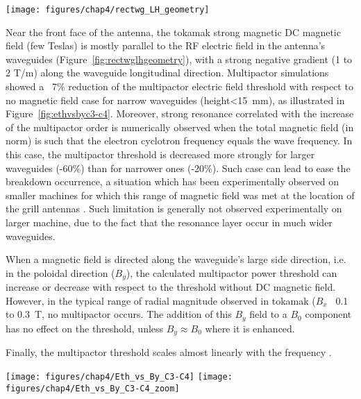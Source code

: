 \begin{marginfigure}
	\centering
	\texttt{[image: figures/chap4/rectwg\_LH\_geometry]}
	\caption{Typical geometry of a LHRF antenna thin rectangular waveguide close to the plasma.}
	\label{fig:rectwglhgeometry}
\end{marginfigure}
Near the front face of the antenna, the tokamak strong magnetic DC magnetic field (few Teslas) is mostly parallel to the RF electric field in the antenna’s waveguides (Figure~\ref{fig:rectwglhgeometry}), with a strong negative gradient (1 to 2 T/m) along the waveguide longitudinal direction. Multipactor simulations showed a ~7\% reduction of the multipactor electric field threshold with respect to no magnetic field case for narrow waveguides (height<15~mm), as illustrated in Figure~\ref{fig:ethvsbyc3-c4}. Moreover, strong resonance correlated with the increase of the multipactor order is numerically observed when the total magnetic field (in norm) is such that the electron cyclotron frequency equals the wave frequency. In this case, the multipactor threshold is decreased more strongly for larger waveguides (-60\%) than for narrower ones (-20\%). Such case can lead to ease the breakdown occurrence, a situation which has been experimentally observed on smaller machines for which this range of magnetic field was met at the location of the grill antennas . Such limitation is generally not observed experimentally on larger machine, due to the fact that the resonance layer occur in much wider waveguides. 

When a magnetic field is directed along the waveguide’s large side direction, i.e. in the poloidal direction ($B_y$), the calculated multipactor power threshold can increase or decrease with respect to the threshold without DC magnetic field. However, in the typical range of radial magnitude observed in tokamak ($B_x$ ~0.1 to 0.3~T, no multipactor occurs. The addition of this $B_y$ field to a $B_0$ component has no effect on the threshold, unless $B_y \approx B_0$ where it is enhanced. 

Finally, the multipactor threshold scales almost linearly with the frequency .


\begin{figure*}[h]
	\centering
	\texttt{[image: figures/chap4/Eth\_vs\_By\_C3-C4]}
	\texttt{[image: figures/chap4/Eth\_vs\_By\_C3-C4\_zoom]}
	\caption{Left: Multipactor electric field threshold for the thin rectangular waveguides of the WEST LH1 and LH2 antennas (70x8mm for LH1 and 76x14.65mm for LH2) at 3.7~GHz versus magnitude of the DC magnetic field $B_0$ parallel to the electric field. Right: zoom for $B_0$ in [$0.12,0.14$T]. Dashed lines are the multipactor threshold without magnetic field. Green dot-dashed vertical line corresponds to cyclotron resonance magnetic field. SEY from Spark3D ECSS Copper (perfectly matched transmission line).}
	\label{fig:ethvsbyc3-c4}
\end{figure*}

